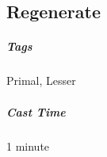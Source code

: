 
\subsection{Regenerate\label{spell:regenerate}}
\subparagraph*{Tags} Primal, Lesser
\subparagraph*{Cast Time} 1 minute

